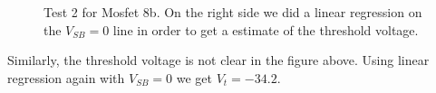 \documentclass{article}
\begin{document}
\begin{figure}[H]
\centering
{}
\caption{Test 2 for Mosfet 8b. On the right side we did a linear regression on the $V_{SB} = 0$ line in order to get a estimate of the threshold voltage.}
\label{fig:8blin}
\end{figure}

Similarly, the threshold voltage is not clear in the figure above. Using linear regression again with $V_{SB} = 0$ we get $V_t = -34.2$.
\end{document}
